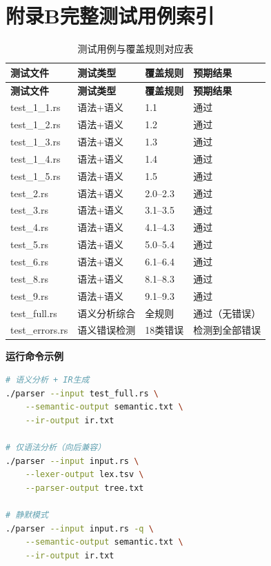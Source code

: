 \documentclass[12pt,a4paper]{ctexart}
\begin{document}
\newpage

\section*{附录B\quad 完整测试用例索引}

\begin{longtable}{|l|l|l|l|}
\caption{测试用例与覆盖规则对应表} \\
\hline
\textbf{测试文件} & \textbf{测试类型} & \textbf{覆盖规则} & \textbf{预期结果} \\
\hline
\endfirsthead
\hline
\textbf{测试文件} & \textbf{测试类型} & \textbf{覆盖规则} & \textbf{预期结果} \\
\hline
\endhead
\hline
\endfoot
\hline
\endlastfoot

test\_1\_1.rs & 语法+语义 & 1.1 & 通过 \\
test\_1\_2.rs & 语法+语义 & 1.2 & 通过 \\
test\_1\_3.rs & 语法+语义 & 1.3 & 通过 \\
test\_1\_4.rs & 语法+语义 & 1.4 & 通过 \\
test\_1\_5.rs & 语法+语义 & 1.5 & 通过 \\
test\_2.rs & 语法+语义 & 2.0--2.3 & 通过 \\
test\_3.rs & 语法+语义 & 3.1--3.5 & 通过 \\
test\_4.rs & 语法+语义 & 4.1--4.3 & 通过 \\
test\_5.rs & 语法+语义 & 5.0--5.4 & 通过 \\
test\_6.rs & 语法+语义 & 6.1--6.4 & 通过 \\
test\_8.rs & 语法+语义 & 8.1--8.3 & 通过 \\
test\_9.rs & 语法+语义 & 9.1--9.3 & 通过 \\
\hline
test\_full.rs & 语义分析综合 & 全规则 & 通过（无错误） \\
test\_errors.rs & 语义错误检测 & 18类错误 & 检测到全部错误 \\
\hline
\end{longtable}

\textbf{运行命令示例}

\begin{lstlisting}[language=bash, caption={完整流水线运行命令}]
# 语义分析 + IR生成
./parser --input test_full.rs \
    --semantic-output semantic.txt \
    --ir-output ir.txt

# 仅语法分析（向后兼容）
./parser --input input.rs \
    --lexer-output lex.tsv \
    --parser-output tree.txt

# 静默模式
./parser --input input.rs -q \
    --semantic-output semantic.txt \
    --ir-output ir.txt
\end{lstlisting}

\newpage
\end{document}
